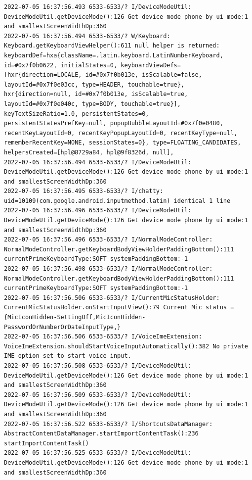\documentclass[a4paper,12pt]{book}
\begin{document}
\begin{lstlisting}
2022-07-05 16:37:56.493 6533-6533/? I/DeviceModeUtil: DeviceModeUtil.getDeviceMode():126 Get device mode phone by ui mode:1 and smallestScreenWidthDp:360
2022-07-05 16:37:56.494 6533-6533/? W/Keyboard: Keyboard.getKeyboardViewHelper():611 null helper is returned: keyboardDef=hxa{className=.latin.keyboard.LatinNumberKeyboard, id=#0x7f0b0622, initialStates=0, keyboardViewDefs=[hxr{direction=LOCALE, id=#0x7f0b013e, isScalable=false, layoutId=#0x7f0e03cc, type=HEADER, touchable=true}, hxr{direction=null, id=#0x7f0b013e, isScalable=true, layoutId=#0x7f0e040c, type=BODY, touchable=true}], keyTextSizeRatio=1.0, persistentStates=0, persistentStatesPrefKey=null, popupBubbleLayoutId=#0x7f0e0480, recentKeyLayoutId=0, recentKeyPopupLayoutId=0, recentKeyType=null, rememberRecentKey=NONE, sessionStates=0}, type=FLOATING_CANDIDATES, helpersCreated=[hpl@8729a84, hpl@9f8326d, null], 
2022-07-05 16:37:56.494 6533-6533/? I/DeviceModeUtil: DeviceModeUtil.getDeviceMode():126 Get device mode phone by ui mode:1 and smallestScreenWidthDp:360
2022-07-05 16:37:56.495 6533-6533/? I/chatty: uid=10109(com.google.android.inputmethod.latin) identical 1 line
2022-07-05 16:37:56.496 6533-6533/? I/DeviceModeUtil: DeviceModeUtil.getDeviceMode():126 Get device mode phone by ui mode:1 and smallestScreenWidthDp:360
2022-07-05 16:37:56.496 6533-6533/? I/NormalModeController: NormalModeController.getKeyboardBodyViewHolderPaddingBottom():111 currentPrimeKeyboardType:SOFT systemPaddingBottom:-1
2022-07-05 16:37:56.498 6533-6533/? I/NormalModeController: NormalModeController.getKeyboardBodyViewHolderPaddingBottom():111 currentPrimeKeyboardType:SOFT systemPaddingBottom:-1
2022-07-05 16:37:56.506 6533-6533/? I/CurrentMicStatusHolder: CurrentMicStatusHolder.onStartInputView():79 Current Mic status = {MicIconHidden-SettingOff,MicIconHidden-PasswordOrNumberOrDateInputType,}
2022-07-05 16:37:56.506 6533-6533/? I/VoiceImeExtension: VoiceImeExtension.shouldStartVoiceInputAutomatically():382 No private IME option set to start voice input.
2022-07-05 16:37:56.508 6533-6533/? I/DeviceModeUtil: DeviceModeUtil.getDeviceMode():126 Get device mode phone by ui mode:1 and smallestScreenWidthDp:360
2022-07-05 16:37:56.509 6533-6533/? I/DeviceModeUtil: DeviceModeUtil.getDeviceMode():126 Get device mode phone by ui mode:1 and smallestScreenWidthDp:360
2022-07-05 16:37:56.522 6533-6533/? I/ShortcutsDataManager: AbstractContentDataManager.startImportContentTask():236 startImportContentTask()
2022-07-05 16:37:56.525 6533-6533/? I/DeviceModeUtil: DeviceModeUtil.getDeviceMode():126 Get device mode phone by ui mode:1 and smallestScreenWidthDp:360

\end{lstlisting}
\end{document}
